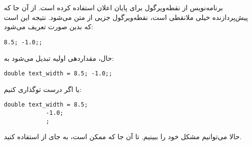 \section{}
\paragraph{}\label{answer:82}
برنامه‌نویس از نقطه‌ویرگول برای پایان اعلان  استفاده کرده است. از آن جا که پیش‌پردازنده خیلی ملانقطی است، نقطه‌ویرگول جزیی از متن می‌شود. نتیجه این است که  بدین صورت تعریف می‌شود:
\begin{LTR}
        \begin{lstlisting}[style=C++Style]
            8.5; -1.0;;
        \end{lstlisting}
\end{LTR}

حال، مقدار‌دهی اولیه  تبدیل می‌شود به:
\begin{LTR}
        \begin{lstlisting}[style=C++Style]
            double text_width = 8.5; -1.0;;
        \end{lstlisting}
\end{LTR}

یا اگر درست توگذاری کنیم:
\begin{LTR}
        \begin{lstlisting}[style=C++Style]
            double text_width = 8.5;
            -1.0;
            ;
        \end{lstlisting}
\end{LTR}

حالا می‌توانیم مشکل خود را ببینیم. تا آن جا که ممکن است، به جای  از  استفاده کنید.
